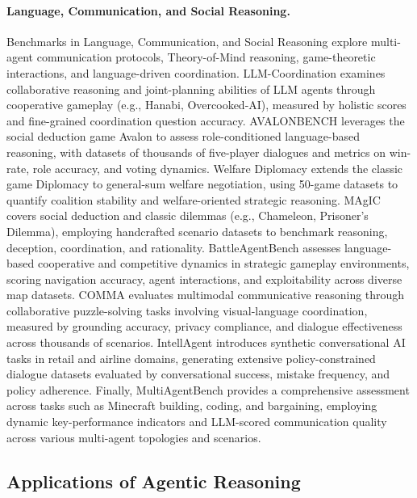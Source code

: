 \paragraph{Language, Communication, and Social Reasoning.}
Benchmarks in Language, Communication, and Social Reasoning explore multi-agent communication protocols, Theory-of-Mind reasoning, game-theoretic interactions, and language-driven coordination. LLM-Coordination \citep{agashe2023llm} examines collaborative reasoning and joint-planning abilities of LLM agents through cooperative gameplay (e.g., Hanabi, Overcooked-AI), measured by holistic scores and fine-grained coordination question accuracy. AVALONBENCH \citep{jonathan2023avalonbench} leverages the social deduction game Avalon to assess role-conditioned language-based reasoning, with datasets of thousands of five-player dialogues and metrics on win-rate, role accuracy, and voting dynamics. Welfare Diplomacy \citep{mukobi2023welfare} extends the classic game Diplomacy to general-sum welfare negotiation, using 50-game datasets to quantify coalition stability and welfare-oriented strategic reasoning. MAgIC \citep{xu2023magic} covers social deduction and classic dilemmas (e.g., Chameleon, Prisoner's Dilemma), employing handcrafted scenario datasets to benchmark reasoning, deception, coordination, and rationality. BattleAgentBench \citep{wang2024battleagentbench} assesses language-based cooperative and competitive dynamics in strategic gameplay environments, scoring navigation accuracy, agent interactions, and exploitability across diverse map datasets. COMMA \citep{ossowski2024comma} evaluates multimodal communicative reasoning through collaborative puzzle-solving tasks involving visual-language coordination, measured by grounding accuracy, privacy compliance, and dialogue effectiveness across thousands of scenarios. IntellAgent \citep{levi2025intellagent} introduces synthetic conversational AI tasks in retail and airline domains, generating extensive policy-constrained dialogue datasets evaluated by conversational success, mistake frequency, and policy adherence. Finally, MultiAgentBench \citep{zhu2025multiagentbench} provides a comprehensive assessment across tasks such as Minecraft building, coding, and bargaining, employing dynamic key-performance indicators and LLM-scored communication quality across various multi-agent topologies and scenarios.

\subsection{Applications of Agentic Reasoning}
\label{sec:app-benchmark}

